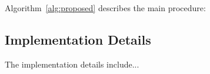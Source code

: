 Algorithm~\ref{alg:proposed} describes the main procedure:


\subsection{Implementation Details}

The implementation details include...